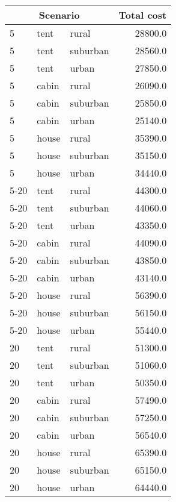 
\begin{center}
\begin{tabular}{lllr}
\multicolumn{3}{c}{Scenario} & Total cost \\ \hline
5 & tent & rural & 28800.0 \\
5 & tent & suburban & 28560.0 \\
5 & tent & urban & 27850.0 \\
5 & cabin & rural & 26090.0 \\
5 & cabin & suburban & 25850.0 \\
5 & cabin & urban & 25140.0 \\
5 & house & rural & 35390.0 \\
5 & house & suburban & 35150.0 \\
5 & house & urban & 34440.0 \\
5-20 & tent & rural & 44300.0 \\
5-20 & tent & suburban & 44060.0 \\
5-20 & tent & urban & 43350.0 \\
5-20 & cabin & rural & 44090.0 \\
5-20 & cabin & suburban & 43850.0 \\
5-20 & cabin & urban & 43140.0 \\
5-20 & house & rural & 56390.0 \\
5-20 & house & suburban & 56150.0 \\
5-20 & house & urban & 55440.0 \\
20 & tent & rural & 51300.0 \\
20 & tent & suburban & 51060.0 \\
20 & tent & urban & 50350.0 \\
20 & cabin & rural & 57490.0 \\
20 & cabin & suburban & 57250.0 \\
20 & cabin & urban & 56540.0 \\
20 & house & rural & 65390.0 \\
20 & house & suburban & 65150.0 \\
20 & house & urban & 64440.0 \\
\end{tabular}
\end{center}
